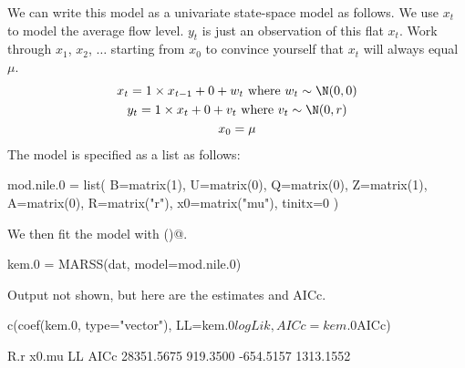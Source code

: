 We can write this model as a univariate state-space model as follows. We use $x_t$ to model the average flow level.  $y_t$ is just an observation of this flat $x_t$.  Work through $x_1$, $x_2$, $\dots$ starting from $x_0$ to convince yourself that $x_t$ will always equal $\mu$.
\begin{equation}
\begin{gathered}
x_t = 1 \times x_{t-1}+ 0 + w_t    \text{ where } w_t \sim \N(0,0) \\
y_t = 1 \times x_t + 0 + v_t \text{ where } v_t \sim \N(0,r)  \\
x_0 = \mu 
 \end{gathered}   
 \label{eq:marss.model.0}\end{equation}
The model is specified as a list as follows:
\begin{Schunk}
\begin{Sinput}
 mod.nile.0 = list( 
 B=matrix(1), U=matrix(0), Q=matrix(0),
 Z=matrix(1), A=matrix(0), R=matrix("r"),
 x0=matrix("mu"), tinitx=0 )
\end{Sinput}
\end{Schunk}

We then fit the model with \verb@MARSS()@.  
\begin{Schunk}
\begin{Sinput}
 kem.0 = MARSS(dat, model=mod.nile.0)
\end{Sinput}
\end{Schunk}
Output not shown, but here are the estimates and AICc.
\begin{Schunk}
\begin{Sinput}
 c(coef(kem.0, type="vector"), LL=kem.0$logLik, AICc=kem.0$AICc)
\end{Sinput}
\begin{Soutput}
       R.r      x0.mu         LL       AICc 
28351.5675   919.3500  -654.5157  1313.1552 
\end{Soutput}
\end{Schunk}
